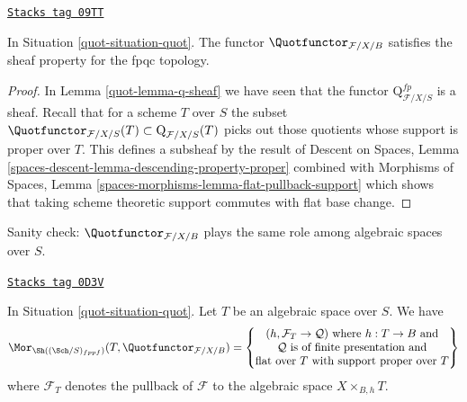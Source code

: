 \begin{lemma}
\label{quot-lemma-quot-sheaf}
\href{https://stacks.math.columbia.edu/tag/09TT}{\texttt{Stacks tag 09TT}}

In Situation \ref{quot-situation-quot}. The functor $\Quotfunctor_{\mathcal{F}/X/B}$
satisfies the sheaf property for the fpqc topology.
\end{lemma}

\begin{proof}

In Lemma \ref{quot-lemma-q-sheaf} we have seen that the functor
$\text{Q}^{fp}_{\mathcal{F}/X/S}$ is a sheaf. Recall that for a
scheme $T$ over $S$ the subset
$\Quotfunctor_{\mathcal{F}/X/S}(T) \subset \text{Q}_{\mathcal{F}/X/S}(T)$
picks out those quotients whose support is proper over $T$.
This defines a subsheaf by the result of
Descent on Spaces, Lemma \ref{spaces-descent-lemma-descending-property-proper}
combined with
Morphisms of Spaces, Lemma \ref{spaces-morphisms-lemma-flat-pullback-support}
which shows that taking scheme theoretic support commutes
with flat base change.
\end{proof}

Sanity check: $\Quotfunctor_{\mathcal{F}/X/B}$
plays the same role among algebraic spaces
over $S$.

\begin{lemma}
\label{quot-lemma-extend-quot-to-spaces}
\href{https://stacks.math.columbia.edu/tag/0D3V}{\texttt{Stacks tag 0D3V}}

In Situation \ref{quot-situation-quot}. Let $T$ be an algebraic space over $S$.
We have
$$
\Mor_{\Sh((\Sch/S)_{fppf})}(T,  \Quotfunctor_{\mathcal{F}/X/B}) =
\left\{
\begin{matrix}
(h, \mathcal{F}_T \to \mathcal{Q}) \text{ where }
h : T \to B \text{ and}\\
\mathcal{Q}\text{ is of finite presentation and}\\
\text{flat over }T\text{ with support proper over }T
\end{matrix}
\right\}
$$
where $\mathcal{F}_T$ denotes the pullback of $\mathcal{F}$
to the algebraic space $X \times_{B, h} T$.
\end{lemma}

